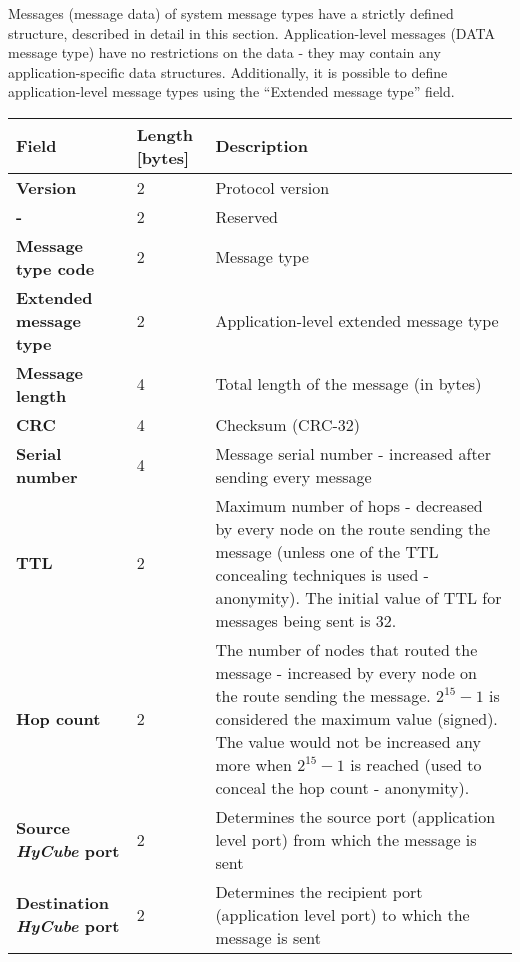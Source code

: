 Messages (message data) of system message types have a strictly defined structure, described in detail in this section. Application-level messages (DATA message type) have no restrictions on the data - they may contain any application-specific data structures. Additionally, it is possible to define application-level message types using the ``Extended message type'' field.

\begin{table}[H]
\scriptsize
\begin{center}
\begin{tabular}{p{3cm} p{2cm} p{9.5cm}}
	\hline
	\textbf{Field}						& \textbf{Length} [bytes]				& \textbf{Description}				\\[1mm]
    \hline
    \textbf{Version}					& 2										& Protocol version					\\[1.5mm]
	\textbf{-}							& 2										& Reserved							\\[1.5mm]
	\textbf{Message type code}			& 2										& Message type						\\[1.5mm]
	\textbf{Extended message type}		& 2										& Application-level extended message type									\\[1.5mm]
	\textbf{Message length}				& 4										& Total length of the message (in bytes)									\\[1.5mm]
	\textbf{CRC}						& 4										& Checksum (CRC-32)							\\[1.5mm]
	\textbf{Serial number}				& 4										& Message serial number - increased after sending every message									\\[1.5mm]
	\textbf{TTL}						& 2										& Maximum number of hops - decreased by every node on the route sending the message	(unless one of the TTL concealing techniques is used - anonymity). The initial value of TTL for messages being sent is 32.			\\[1.5mm]
	\textbf{Hop count}					& 2										& The number of nodes that routed the message - increased by every node on the route sending the message. $2^{15}-1$ is considered the maximum value (signed). The value would not be increased any more when $2^{15}-1$ is reached (used to conceal the hop count - anonymity).			\\[1.5mm]
	\textbf{Source \emph{HyCube} port}			& 2								& Determines the source port (application level port) from which the message is sent			\\[1.5mm]
	\textbf{Destination \emph{HyCube} port}	& 2									& Determines the recipient port (application level port) to which the message is sent		\\[1.5mm]

\end{tabular}
\end{center}
\end{table}
